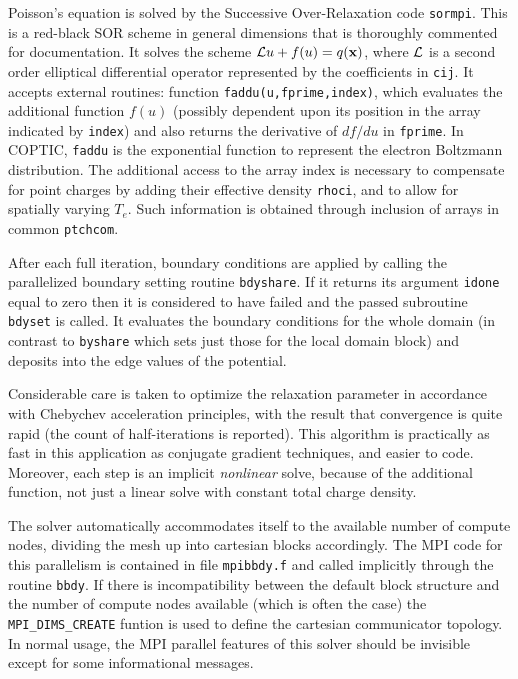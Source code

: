 \documentclass[12pt]{article}
\begin{document}
Poisson's equation is solved by the Successive Over-Relaxation code
\verb!sormpi!. This is a red-black SOR scheme in general dimensions
that is thoroughly commented for documentation. It solves the scheme
${\cal L}u+f(u) = q({\bf x})$, where ${\cal L}$ is a second order
elliptical differential operator represented by the coefficients in
\verb!cij!. It accepts external routines: function
\verb!faddu(u,fprime,index)!, which evaluates the additional function
$f(u)$ (possibly dependent upon its position in the array indicated by
\verb!index!) and also returns the derivative of $df/du$ in
\verb!fprime!. In COPTIC, \verb!faddu! is the exponential function to
represent the electron Boltzmann distribution. The additional access
to the array index is necessary to compensate for point charges by
adding their effective density \verb!rhoci!, and to allow for
spatially varying $T_e$. Such information is obtained
through inclusion of arrays in common \verb!ptchcom!.

After each full iteration, boundary conditions are applied by calling
the parallelized boundary setting routine \verb!bdyshare!. If it
returns its argument \verb!idone!  equal to zero then it is
considered to have failed and the passed subroutine \verb!bdyset! is
called. It evaluates the boundary conditions for the whole domain (in
contrast to \verb!byshare! which sets just those for the local domain
block) and deposits into the edge values of the potential.

Considerable care is taken to optimize the relaxation parameter in
accordance with Chebychev acceleration principles, with the result
that convergence is quite rapid (the count of half-iterations is
reported). This algorithm is practically as fast in this application as
conjugate gradient techniques, and easier to code. Moreover, each step is an
implicit \emph{nonlinear} solve, because of the additional function,
not just a linear solve with constant total charge density.

The solver automatically accommodates itself to the available number
of compute nodes, dividing the mesh up into cartesian blocks
accordingly.  The MPI code for this parallelism is contained in file
\verb!mpibbdy.f! and called implicitly through the routine
\verb!bbdy!. If there is incompatibility between the default block
structure and the number of compute nodes available (which is often
the case) the \verb!MPI_DIMS_CREATE! funtion is used to define the
cartesian communicator topology. In normal usage, the MPI parallel
features of this solver should be invisible except for some
informational messages.  
\end{document}
